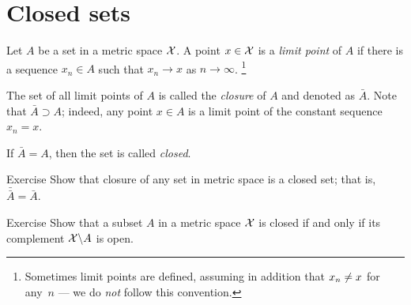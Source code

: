 \section{Closed sets}

Let $A$ be a set in a metric space $\mathcal{X}$.
A point $x\in \mathcal{X}$ is a \emph{limit point} of $A$ if there is a sequence $x_n\in A$ such that $x_n\to x$ as $n\to\infty$.%
\footnote{Sometimes limit points are defined, assuming in addition that $x_n\z\ne x$ for any~$n$ --- we do \textit{not} follow this convention.}

The set of all limit points of $A$ is called the \emph{closure} of $A$ and denoted as $\bar A$.
Note that $\bar A\supset A$;
indeed, any point $x\in A$ is a limit point of the constant sequence $x_n=x$.

If $\bar A= A$, then the set is called \emph{closed}.

\begin{thm}{Exercise}
Show that closure of any set in metric space is a closed set;
that is, $\bar{\bar A}= \bar A$.
\end{thm}

\begin{thm}{Exercise}
Show that a subset $A$ in a metric space $\mathcal{X}$ is closed if and only if its complement $\mathcal{X}\backslash A$ is open.
\end{thm}



